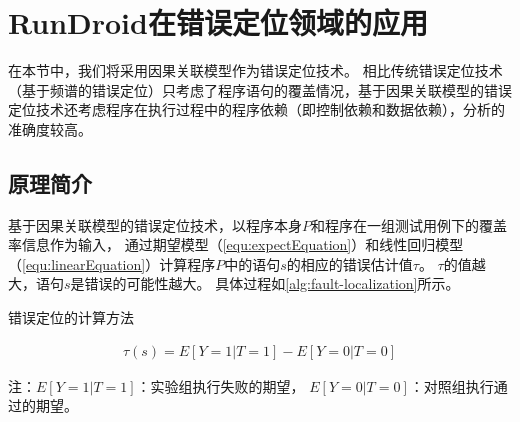 \section{RunDroid在错误定位领域的应用}
在本节中，我们将采用因果关联模型\cite{baah2010causal,baah2011mitigating}作为错误定位技术。
相比传统错误定位技术（基于频谱的错误定位）只考虑了程序语句的覆盖情况，基于因果关联模型的错误定位技术还考虑程序在执行过程中的程序依赖（即控制依赖和数据依赖），分析的准确度较高。

\subsection{原理简介}

基于因果关联模型的错误定位技术，以程序本身$P$和程序在一组测试用例下的覆盖率信息作为输入，
通过期望模型（\autoref{equ:expectEquation}）和线性回归模型（\autoref{equ:linearEquation}）计算程序$P$中的语句$s$的相应的错误估计值$\tau$。
$\tau$的值越大，语句$s$是错误的可能性越大。
具体过程如\autoref{alg:fault-localization}所示。



\begin{algorithm}[!ht]
	
	
	\caption{错误定位的计算方法} 
	
	
	\label{alg:fault-localization}
	
	
	
	
\end{algorithm}



\begin{equation}
\begin{aligned}
\tau(s) = E[Y=1|T=1] - E [Y=0|T=0] 
\end{aligned}
\label{equ:expectEquation} 
\end{equation}
\begin{scriptsize}
	注：$E[Y=1|T=1]$：实验组执行失败的期望， $E[Y=0|T=0]$：对照组执行通过的期望。
\end{scriptsize}

